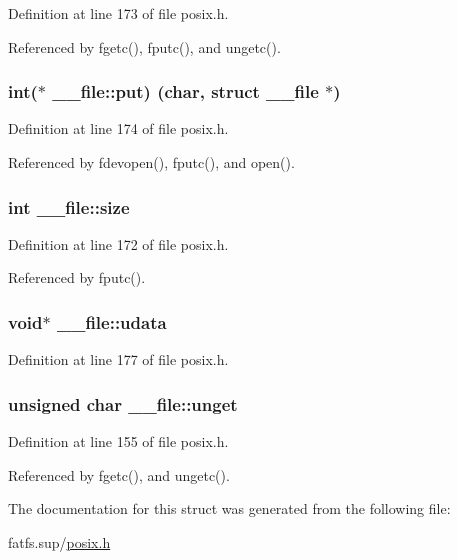 Definition at line 173 of file posix.\+h.



Referenced by fgetc(), fputc(), and ungetc().

\subsubsection[{\texorpdfstring{put}{put}}]{\setlength{\rightskip}{0pt plus 5cm}int($\ast$ \+\_\+\+\_\+file\+::put) (char, struct {\bf \+\_\+\+\_\+file} $\ast$)}\hypertarget{struct____file_a01c8b217e42cc11b6a7f8429114e9d46}{}\label{struct____file_a01c8b217e42cc11b6a7f8429114e9d46}


Definition at line 174 of file posix.\+h.



Referenced by fdevopen(), fputc(), and open().

\subsubsection[{\texorpdfstring{size}{size}}]{\setlength{\rightskip}{0pt plus 5cm}int \+\_\+\+\_\+file\+::size}\hypertarget{struct____file_aff4a1ca8b6a12460812928afae81248d}{}\label{struct____file_aff4a1ca8b6a12460812928afae81248d}


Definition at line 172 of file posix.\+h.



Referenced by fputc().

\subsubsection[{\texorpdfstring{udata}{udata}}]{\setlength{\rightskip}{0pt plus 5cm}void$\ast$ \+\_\+\+\_\+file\+::udata}\hypertarget{struct____file_abe6f3bdb4df4119277132eb3e13a4628}{}\label{struct____file_abe6f3bdb4df4119277132eb3e13a4628}


Definition at line 177 of file posix.\+h.

\subsubsection[{\texorpdfstring{unget}{unget}}]{\setlength{\rightskip}{0pt plus 5cm}unsigned char \+\_\+\+\_\+file\+::unget}\hypertarget{struct____file_a1d139ae3cb11a1fada469a49f7d3d3b6}{}\label{struct____file_a1d139ae3cb11a1fada469a49f7d3d3b6}


Definition at line 155 of file posix.\+h.



Referenced by fgetc(), and ungetc().



The documentation for this struct was generated from the following file\+:\begin{DoxyCompactItemize}
\item 
fatfs.\+sup/\hyperlink{posix_8h}{posix.\+h}\end{DoxyCompactItemize}
